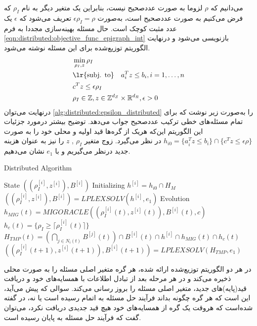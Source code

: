 	می‌دانیم که $\rho$ لزوما به صورت عددصحیح نیست، بنابراین یک متغیر دیگر به نام $\rho_I$ که فرض می‌کنیم به صورت عددصحیح است، به‌صورت $\epsilon\rho_I = \rho$ تعریف می‌شود که $\epsilon$ یک عدد مثبت کوچک است. حال مسئله بهینه‌سازی مجددا به فرم \cref{eqn:distributed:objective_func_epigraph_int} بازنویسی می‌شود و درنهایت الگوریتم توزیع‌شده برای این مسئله نوشته می‌شود. 
	\begin{subequations}\label{eqn:distributed:objective_func_epigraph_int}
		\begin{align}
		&\min_{\rho_I,z}\rho_I \\
		&\text{\lr{subj. to}} \quad a_i^Tz \le b_i, i = 1, \dots, n  \\
		&c^Tz \le \epsilon \rho_I \\
		&\rho_I \in \mathbb{Z}, z \in \mathbb{Z}^{d_Z} \times \mathbb{R}^{d_R}, \epsilon > 0 \\
		\end{align}
	\end{subequations}
	درنهایت می‌توان \cref{alg:distributed:epsilon_distributed} را به‌صورت زیر نوشت که برای تمام مسئله‌های خطی ترکیب عددصحیح جواب می‌دهد. توضیح بیشتر درمورد جزئیات این الگوریتم این‌که هریک از گره‌ها قید اولیه و محلی خود را به صورت $h_{i0} = \{ a_i^Tz \le b_i\} \cap \{c^Tz \le \epsilon\rho\}$ در نظر می‌گیرد. زوج متغیر $\rho_I$ , $z$ را نیز به عنوان هزینه جدید درنظر می‌گیریم و با $e_1$ نشان می‌دهیم. 
\begin{latin}
	\begin{algorithm}
		\caption{Distributed Algorithm}
		\label{alg:distributed:epsilon_distributed}
		\begin{algorithmic}[1]
			\Statex State $((\rho_I^{[i]},z^{[i]}),B^{[i]})$
			\Statex Initializing    
			\State $h^{[i]} = h_{i0} \cap H_M$
			\State $((\rho_I^{[i]},z^{[i]}),B^{[i]}) = LPLEXSOLV(h^{[i]}, e_1)$
			\Statex Evolution 
			\State $h_{MIG}(t) = MIGORACLE((\rho_I^{[i]}(t),z^{[i]}(t)),B^{[i]}(t),c)$
			\State $h_c(t) = \{ \rho_I \ge \lceil\rho_I^{[i]}(t)\rceil \} $
			\State $\displaystyle H_{TMP}(t) = (\bigcap_{j \in N_i(t)}B^{[j]}(t)) \cap B^{[i]}(t) \cap h^{[i]} \cap h_{MIG}(t) \cap h_c(t)$
			\State $((\rho_I^{[i]}(t+1),z^{[i]}(t+1)),B^{[i]}(t+1)) = LPLEXSOLV(H_{TMP}, e_1)$
		\end{algorithmic}
	\end{algorithm}
\end{latin}

در هر دو الگوریتم توزیع‌شده ارائه شده، هر گره متغیر اصلی مسئله را به صورت محلی ذخیره می‌کند و در هر مرحله بعد از تبادل اطلاعات با همسایه‌های خود و دریافت قید(پایه)های جدید، متغیر اصلی مسئله را بروز رسانی می‌کند. سوالی که پیش می‌آید، این است که هر گره چگونه بداند فرآیند حل مسئله به اتمام رسیده است یا نه، در \cite{testa2019distributed} گفته شده‌است که هروقت یک گره از همسایه‌های خود هیچ قید جدیدی دریافت نکرد، می‌توان گفت که فرآیند حل مسئله به پایان رسیده است. 

